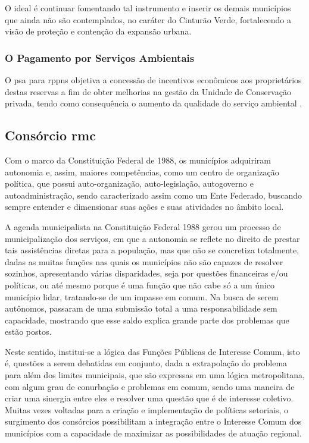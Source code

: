 	O ideal é continuar fomentando tal instrumento e inserir os demais municípios que ainda não são contemplados, no caráter do Cinturão Verde, fortalecendo a visão de proteção e contenção da expansão urbana.
	
	\subsubsection{O Pagamento por Serviços Ambientais}
	
	O \glsdesc{psa} para \gls{rppn}s objetiva a concessão de incentivos econômicos aos proprietários destas reservas a fim de obter melhorias na gestão da Unidade de Conservação privada, tendo como consequência o aumento da qualidade do serviço ambiental \cite{iappr2019b}.
	
	\subsection{Consórcio \glsdesc{rmc}}
	
	Com o marco da Constituição Federal de 1988, os municípios adquiriram autonomia e, assim, maiores competências, como um centro de organização política, que possui auto-organização, auto-legislação, autogoverno e autoadministração, sendo caracterizado assim como um Ente Federado, buscando sempre entender e dimensionar suas ações e suas atividades no âmbito local.
	
	A agenda municipalista na Constituição Federal 1988 gerou um processo de municipalização dos serviços, em que a autonomia se reflete no direito de prestar tais assistências diretas para a população, mas que não se concretiza totalmente, dadas as muitas funções nas quais os municípios não são capazes de resolver sozinhos, apresentando várias disparidades, seja por questões financeiras e/ou políticas, ou até mesmo porque é uma função que não cabe só a um único município lidar, tratando-se de um impasse em comum. Na busca de serem autônomos, passaram de uma submissão total a uma responsabilidade sem capacidade, mostrando que esse saldo explica grande parte dos problemas que estão postos.
	
	Neste sentido, institui-se a lógica das Funções Públicas de Interesse Comum, isto é, questões a serem debatidas em conjunto, dada a extrapolação do problema para além dos limites municipais, que são expressas em uma lógica metropolitana, com algum grau de conurbação e problemas em comum, sendo uma maneira de criar uma sinergia entre eles e resolver uma questão que é de interesse coletivo. Muitas vezes voltadas para a criação e implementação de políticas setoriais, o surgimento dos consórcios possibilitam a integração entre o Interesse Comum dos municípios com a capacidade de maximizar as possibilidades de atuação regional.
	
